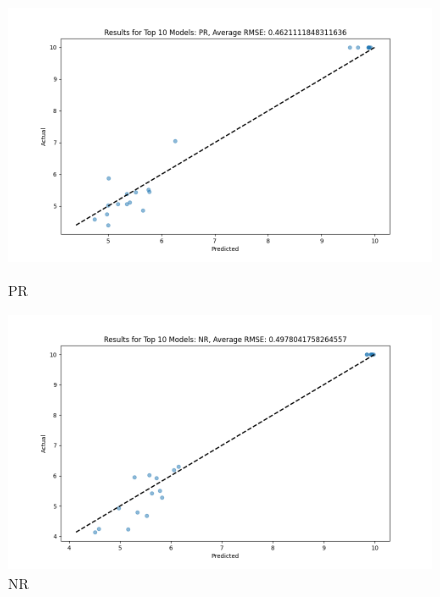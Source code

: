 \begin{figure}[H]
    \centering
    \begin{minipage}{0.495\textwidth}
        \centering
        \includegraphics[width=\linewidth]{reg_section_all/images_reg_ensemble/ensemble_learning_rmse_plot_top_10_Models_PR.png}
        \caption{PR}
        \label{fig:pr_ensemble}
    \end{minipage}\hfill
    \begin{minipage}{0.495\textwidth}
        \centering
        \includegraphics[width=\linewidth]{reg_section_all/images_reg_ensemble/ensemble_learning_rmse_plot_top_10_Models_NR.png}
        \caption{NR}
        \label{fig:nr_ensemble}
    \end{minipage}
\end{figure}

